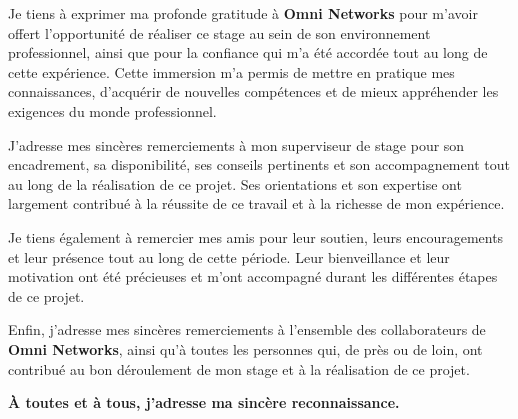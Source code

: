 
Je tiens à exprimer ma profonde gratitude à \textbf{Omni Networks} pour m’avoir offert l’opportunité de réaliser ce stage au sein de son environnement professionnel, ainsi que pour la confiance qui m’a été accordée tout au long de cette expérience. Cette immersion m’a permis de mettre en pratique mes connaissances, d’acquérir de nouvelles compétences et de mieux appréhender les exigences du monde professionnel.

\vspace{0.5cm}

J’adresse mes sincères remerciements à mon superviseur de stage pour son encadrement, sa disponibilité, ses conseils pertinents et son accompagnement tout au long de la réalisation de ce projet. Ses orientations et son expertise ont largement contribué à la réussite de ce travail et à la richesse de mon expérience.

\vspace{0.5cm}

Je tiens également à remercier mes amis pour leur soutien, leurs encouragements et leur présence tout au long de cette période. Leur bienveillance et leur motivation ont été précieuses et m’ont accompagné durant les différentes étapes de ce projet.

\vspace{0.5cm}

Enfin, j’adresse mes sincères remerciements à l’ensemble des collaborateurs de \textbf{Omni Networks}, ainsi qu’à toutes les personnes qui, de près ou de loin, ont contribué au bon déroulement de mon stage et à la réalisation de ce projet.

\vspace{0.5cm}

\textbf{À toutes et à tous, j’adresse ma sincère reconnaissance.}